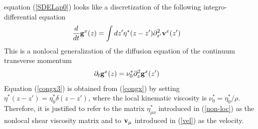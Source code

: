 \documentclass[b5paper,openright,10pt]{book}
\begin{document}
equation (\ref{SDELap0}) looks    like    a   discretization    of    the    following
integro-differential  equation
\begin{align}
  \frac{d}{dt} {\bf g}^{x}(z)&=\int dz'{\eta}^*(z-z')\partial^2_{z'} {\bf v}^{x}(z')
\label{congx}
\end{align}
This is  a nonlocal generalization  of the diffusion equation  of the
continuum transverse  momentum
\begin{align}
  \partial_t {\bf g}^{x}(z)&=\nu^*_0\partial^2_{z}{\bf g}^{x}(z')
\label{congx3}
\end{align}
Equation   (\ref{congx3})   is  obtained  from  (\ref{congx})   by  setting
$\eta^*(z-z')=\eta^*_0\delta(z-z')$,   where   the   local   kinematic
viscosity is  $\nu^*_0=\eta^*_0/\rho$.  Therefore, it is  justified to
refer to the matrix $\eta^*_{\mu\nu}$ introduced in (\ref{non-loc}) as
the  nonlocal shear  viscosity matrix  and to  ${\bf v}_\mu$ introduced  in
(\ref{vel}) as the velocity.

\end{document}
